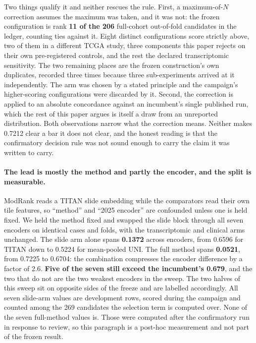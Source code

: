 \documentclass[unnumsec,webpdf,contemporary,large]{oup-authoring-template}
\begin{document}
Two things qualify it and neither rescues the rule. First, a maximum-of-$N$ correction assumes the
maximum was taken, and it was not: the frozen configuration is rank \textbf{11 of the 206}
full-cohort out-of-fold candidates in the ledger, counting ties against it. Eight distinct
configurations score strictly above, two of them in a different TCGA study, three components this
paper rejects on their own pre-registered controls, and the rest the declared transcriptomic
sensitivity. The two remaining places are the frozen construction's own duplicates, recorded three
times because three sub-experiments arrived at it independently. The arm was chosen by a stated
principle and the campaign's higher-scoring configurations were discarded by it. Second, the correction is applied to
an absolute concordance against an incumbent's single published run, which the rest of this paper
argues is itself a draw from an unreported distribution. Both observations narrow what the
correction means. Neither makes 0.7212 clear a bar it does not clear, and the honest reading is
that the confirmatory decision rule was not sound enough to carry the claim it was written to
carry.

\paragraph{The lead is mostly the method and partly the encoder, and the split is measurable.}
ModRank reads a TITAN slide embedding while the comparators read their own tile features, so
``method'' and ``2025 encoder'' are confounded unless one is held fixed. We held the method fixed
and swapped the slide block through all seven encoders on identical cases and folds, with the
transcriptomic and clinical arms unchanged. The slide arm alone spans \textbf{0.1372} across
encoders, from 0.6596 for TITAN down to 0.5224 for mean-pooled UNI. The full method spans
\textbf{0.0521}, from 0.7225 to 0.6704: the combination compresses the encoder difference by a
factor of 2.6. \textbf{Five of the seven still exceed the incumbent's 0.679}, and the two that do
not are the two weakest encoders in the sweep. The two halves of this sweep sit on opposite sides of
the freeze and are labelled accordingly. All seven slide-arm values are development rows, scored
during the campaign and counted among the 269 candidates the selection term is computed over. None
of the seven full-method values is. Those were computed after the confirmatory run in response to
review, so this paragraph is a post-hoc measurement and not part of the frozen result.
\end{document}

